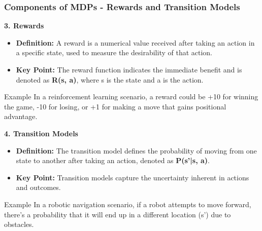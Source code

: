 \documentclass[aspectratio=169]{beamer}
\begin{document}
\begin{frame}[fragile]
    \frametitle{Components of MDPs - Rewards and Transition Models}
    
    \textbf{3. Rewards}
    \begin{itemize}
        \item \textbf{Definition:} A reward is a numerical value received after taking an action in a specific state, used to measure the desirability of that action.
        \item \textbf{Key Point:} The reward function indicates the immediate benefit and is denoted as \textbf{R(s, a)}, where s is the state and a is the action.
    \end{itemize}
    
    \begin{block}{Example}
        In a reinforcement learning scenario, a reward could be +10 for winning the game, -10 for losing, or +1 for making a move that gains positional advantage.
    \end{block}

    \textbf{4. Transition Models}
    \begin{itemize}
        \item \textbf{Definition:} The transition model defines the probability of moving from one state to another after taking an action, denoted as \textbf{P(s'|s, a)}.
        \item \textbf{Key Point:} Transition models capture the uncertainty inherent in actions and outcomes.
    \end{itemize}
    
    \begin{block}{Example}
        In a robotic navigation scenario, if a robot attempts to move forward, there's a probability that it will end up in a different location (s') due to obstacles.
    \end{block}
\end{frame}
\end{document}
